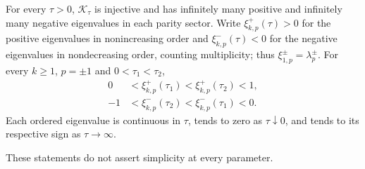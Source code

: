 \begin{theorem}
\label{thm:rev:structure:inertia}\label{thm:rev:structure:monotonicity}
For every $\tau>0$, $\mathcal K_\tau$ is injective and has infinitely many
positive and infinitely many negative eigenvalues in each parity sector.
Write $\xi_{k,p}^+(\tau)>0$ for the positive eigenvalues in
nonincreasing order and $\xi_{k,p}^-(\tau)<0$ for the negative
eigenvalues in nondecreasing order, counting multiplicity; thus
$\xi_{1,p}^{\pm}=\lambda_p^{\pm}$.
For every $k\ge1$, $p=\pm1$ and $0<\tau_1<\tau_2$,
\begin{equation}\label{eq:monotonicity}
\begin{split}
 0&<\xi_{k,p}^+(\tau_1)<\xi_{k,p}^+(\tau_2)<1,\\
 -1&<\xi_{k,p}^-(\tau_2)<\xi_{k,p}^-(\tau_1)<0.
\end{split}
\end{equation}
Each ordered eigenvalue is continuous in $\tau$, tends to zero as
$\tau\downarrow0$, and tends to its respective sign as $\tau\to\infty$.
\end{theorem}
These statements do not assert simplicity at every parameter.
